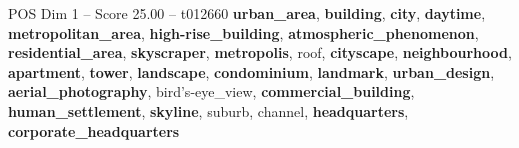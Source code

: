 \begin{textsample}{POS Dim 1 – Score 25.00 – t012660}  \label{ex:f1_pos_008}
\textbf{urban\_area}, \textbf{building}, \textbf{city}, \textbf{daytime}, \textbf{metropolitan\_area}, \textbf{high-rise\_building}, \textbf{atmospheric\_phenomenon}, \textbf{residential\_area}, \textbf{skyscraper}, \textbf{metropolis}, roof, \textbf{cityscape}, \textbf{neighbourhood}, \textbf{apartment}, \textbf{tower}, \textbf{landscape}, \textbf{condominium}, \textbf{landmark}, \textbf{urban\_design}, \textbf{aerial\_photography}, bird's-eye\_view, \textbf{commercial\_building}, \textbf{human\_settlement}, \textbf{skyline}, suburb, channel, \textbf{headquarters}, \textbf{corporate\_headquarters}

\end{textsample}
